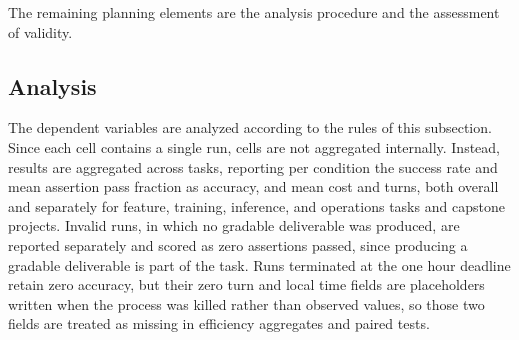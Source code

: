 \documentclass[
english,                 %
bibtex,                  %
]{kththesis}
\numberwithin{listing}{chapter}
\begin{document}
The remaining planning elements are the analysis procedure and the assessment of validity.

\subsection{Analysis}
\label{sec:method_analysis}
\glsresetall

The dependent variables are analyzed according to the rules of this subsection. Since each cell contains a single run, cells are not aggregated internally. Instead, results are aggregated across tasks, reporting per condition the success rate and mean assertion pass fraction as accuracy, and mean cost and turns, both overall and separately for feature, training, inference, and operations tasks and capstone projects. Invalid runs, in which no gradable deliverable was produced, are reported separately and scored as zero assertions passed, since producing a gradable deliverable is part of the task. Runs terminated at the one hour deadline retain zero accuracy, but their zero turn and local time fields are placeholders written when the process was killed rather than observed values, so those two fields are treated as missing in efficiency aggregates and paired tests.
\end{document}
